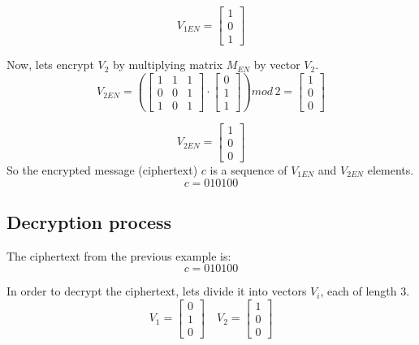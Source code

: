 \documentclass{article}
\begin{document}
        $$
        V_{1EN}=\begin{bmatrix}
        1  \\
        0  \\
        1  
        \end{bmatrix}$$
        \vspace{5mm}
        
        Now, lets encrypt $V_2$ by multiplying matrix $M_{EN}$ by vector $V_2$.
        $$
        V_{2EN}=
        \left(
        \begin{bmatrix}
        1 & 1 & 1 \\
        0 & 0 & 1 \\
        1 & 0 & 1
        \end{bmatrix} \cdot
        \begin{bmatrix}
        0  \\
        1  \\
        1  
        \end{bmatrix}
        \right)
        mod \, 2
        =
        \begin{bmatrix}
        1  \\
        0  \\
        0  
        \end{bmatrix}
        $$
        
        $$
        V_{2EN}=\begin{bmatrix}
        1  \\
        0  \\
        0  
        \end{bmatrix}$$
        \vspace{5mm}
        So the encrypted message (ciphertext) $c$ is a sequence of $V_{1EN}$ and $V_{2EN}$ elements. 
        $$c = 010100$$
\newpage
    \subsection{Decryption process}
        The ciphertext from the previous example is:
        $$c = 010100$$
        
        In order to decrypt the ciphertext, lets divide it into vectors $V_i$, each of length $3$.
        \vspace{1mm}
        $$V_1=\begin{bmatrix}
        0  \\
        1  \\
        0  
        \end{bmatrix} \quad
        V_2=\begin{bmatrix}
        1  \\
        0  \\
        0  
        \end{bmatrix}$$
\end{document}
